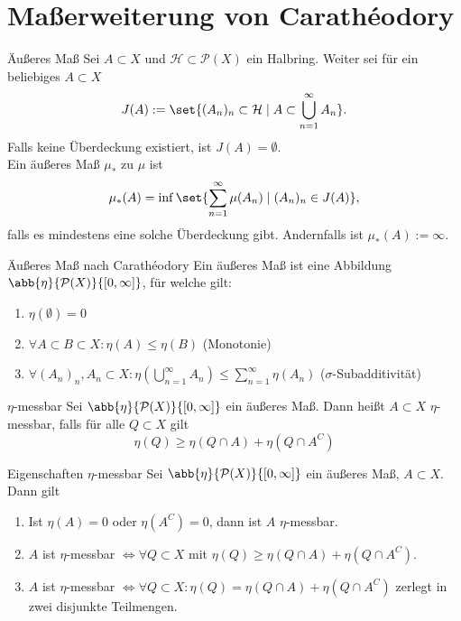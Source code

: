 \section*{Maßerweiterung von Carathéodory}

\begin{karte}{Äußeres Maß}
	Sei \(A \subset X\) und \( \mathcal{H} \subset \mathcal{P}(X) \) ein Halbring.
	Weiter sei für ein beliebiges \(A \subset X\) 
	\[ J(A) := \set{ (A_n)_n \subset \mathcal{H} \;|\; A \subset \bigcup_{n=1}^\infty A_n }. \]
	Falls keine Überdeckung existiert, ist \(J(A) = \emptyset\).\\
	Ein äußeres Maß \( \mu_* \) zu \(\mu\) ist 
	\[ \mu_*(A) = \inf \set{ \sum_{n=1}^\infty \mu(A_n) \;|\; (A_n)_n\in J(A) }, \]
	falls es mindestens eine solche Überdeckung gibt.
	Andernfalls ist \( \mu_*(A) := \infty \).
\end{karte}

\begin{karte}{Äußeres Maß nach Carathéodory}
	Ein äußeres Maß ist eine Abbildung \( \abb{\eta}{\mathcal{P}(X)}{[0,\infty]} \), für welche gilt:
	\begin{enumerate}
		\item \(\eta(\emptyset) = 0\)
		\item \( \forall A \subset B \subset X: \eta(A) \leq \eta(B) \) (Monotonie)
		\item \( \forall (A_n)_n, A_n \subset X: \eta(\bigcup_{n=1}^\infty A_n) \leq \sum_{n=1}^\infty \eta(A_n) \) (\(\sigma\)-Subadditivität)
	\end{enumerate}
\end{karte}

\begin{karte}{\(\eta\)-messbar}
	Sei \( \abb{\eta}{\mathcal{P}(X)}{[0,\infty]} \) ein äußeres Maß. Dann heißt 
	\( A\subset X \) \(\eta\)-messbar, falls für alle \( Q \subset X \) gilt 
	\[ \eta(Q) \geq \eta(Q\cap A) + \eta(Q \cap A^C) \]
\end{karte}

\begin{karte}{Eigenschaften \(\eta\)-messbar}
	Sei \( \abb{\eta}{\mathcal{P}(X)}{[0,\infty]} \) ein äußeres Maß, \(A\subset X\). Dann gilt 
	\begin{enumerate}
		\item Ist \( \eta(A) = 0 \) oder \( \eta(A^C) = 0 \), dann ist \(A\) \(\eta\)-messbar.
		\item \( A \) ist \(\eta\)-messbar \( \Leftrightarrow \forall Q\subset X \) mit 
		\( \eta(Q) \geq \eta(Q\cap A) + \eta(Q \cap A^C) \).
		\item \( A \) ist \(\eta\)-messbar \( \Leftrightarrow \forall Q\subset X: 
		\eta(Q) = \eta(Q\cap A) + \eta(Q\cap A^C) \) zerlegt in zwei disjunkte Teilmengen.
	\end{enumerate}
\end{karte}


